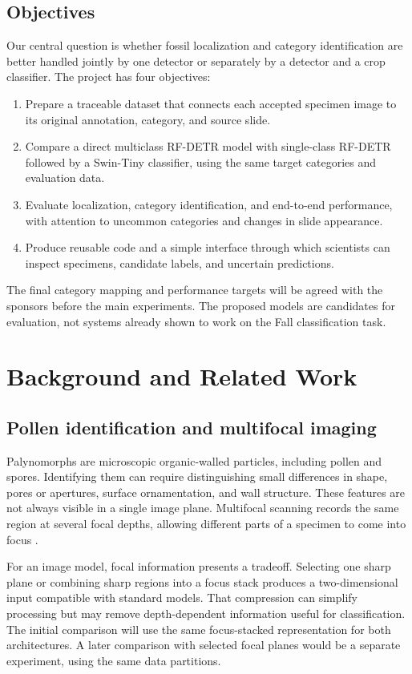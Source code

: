 \documentclass[conference,letterpaper]{IEEEtran}
\begin{document}
\subsection{Objectives}
Our central question is whether fossil localization and category identification are better handled jointly by one detector or separately by a detector and a crop classifier. The project has four objectives:
\begin{enumerate}
\item Prepare a traceable dataset that connects each accepted specimen image to its original annotation, category, and source slide.
\item Compare a direct multiclass RF-DETR model with single-class RF-DETR followed by a Swin-Tiny classifier, using the same target categories and evaluation data.
\item Evaluate localization, category identification, and end-to-end performance, with attention to uncommon categories and changes in slide appearance.
\item Produce reusable code and a simple interface through which scientists can inspect specimens, candidate labels, and uncertain predictions.
\end{enumerate}
The final category mapping and performance targets will be agreed with the sponsors before the main experiments. The proposed models are candidates for evaluation, not systems already shown to work on the Fall classification task.

\section{Background and Related Work}
\subsection{Pollen identification and multifocal imaging}
Palynomorphs are microscopic organic-walled particles, including pollen and spores. Identifying them can require distinguishing small differences in shape, pores or apertures, surface ornamentation, and wall structure. These features are not always visible in a single image plane. Multifocal scanning records the same region at several focal depths, allowing different parts of a specimen to come into focus \cite{shaikh2026,punyasena2022}.

For an image model, focal information presents a tradeoff. Selecting one sharp plane or combining sharp regions into a focus stack produces a two-dimensional input compatible with standard models. That compression can simplify processing but may remove depth-dependent information useful for classification. The initial comparison will use the same focus-stacked representation for both architectures. A later comparison with selected focal planes would be a separate experiment, using the same data partitions.
\end{document}
